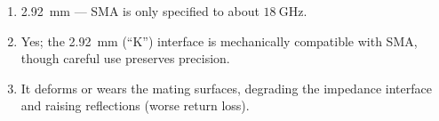 \begin{enumerate}[leftmargin=1.6em,itemsep=2pt]
\item 2.92~mm --- SMA is only specified to about $18\ \text{GHz}$.
\item Yes; the 2.92~mm (``K'') interface is mechanically compatible with SMA, though careful use preserves precision.
\item It deforms or wears the mating surfaces, degrading the impedance interface and raising reflections (worse return loss).
\end{enumerate}
